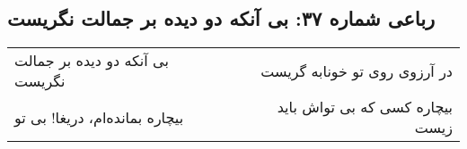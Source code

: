 \begin{center}
\section*{رباعی شماره ۳۷: بی آنکه دو دیده بر جمالت نگریست}
\label{sec:037}
\begin{longtable}{l p{0.5cm} r}
بی آنکه دو دیده بر جمالت نگریست
&&
در آرزوی روی تو خونابه گریست
\\
بیچاره بمانده‌ام، دریغا! بی تو
&&
بیچاره کسی که بی تواش باید زیست
\\
\end{longtable}
\end{center}
